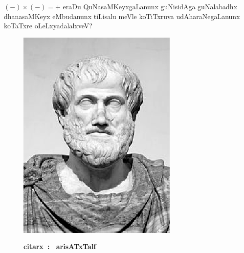 $(-) \times (-) = +$ eraDu QuNasaMKeyxgaLanunx guNisidAga guNalabadhx dhanasaMKeyx eMbudanunx tiLisalu meVle koTiTxruva udAharaNegaLanunx koTaTxre oLeLxyadalalxveV?
\begin{figure}[H]
  \centering\includegraphics{src/figures/Aristotle_1.eps}
  
  {\bf citarx~: ~arisATxTalf} 
     \end{figure}
   
